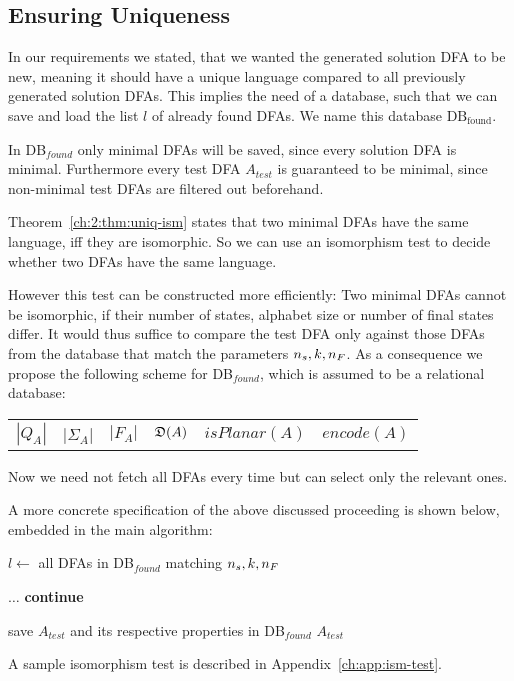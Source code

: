 \subsection{Ensuring Uniqueness}

In our requirements we stated, that we wanted the generated solution DFA to be new, meaning it should have a unique language compared to all previously generated solution DFAs. This implies the need of a database, such that we can save and load the list $l$ of already found DFAs. We name this database $\text{DB}_\text{found}$.

In DB$_{found}$ only minimal DFAs will be saved, since every solution DFA is minimal. Furthermore every test DFA $A_{test}$ is guaranteed to be minimal, since non-minimal test DFAs are filtered out beforehand.

Theorem~\ref{ch:2:thm:uniq-ism} states that two minimal DFAs have the same language, iff they are isomorphic. So we can use an isomorphism test to decide whether two DFAs have the same language.

However this test can be constructed more efficiently: Two minimal DFAs cannot be isomorphic, if their number of states, alphabet size or number of final states differ. It would thus suffice to compare the test DFA only against those DFAs from the database that match the parameters ${n_s}, k, {n_F}$. As a consequence we propose the following scheme for DB$_{found}$, which is assumed to be a relational database:
\begin{center}
	\begin{tabular}{c c c c c c}
	$|Q_A|$ & |$\Sigma_A$| & $|F_A|$ & $\mathfrak{D}(A)$ & $isPlanar(A)$ & $encode(A)$
	\end{tabular}
\end{center}
Now we need not fetch all DFAs every time but can select only the relevant ones.

A more concrete specification of the above discussed proceeding is shown below, embedded in the main algorithm:
\vspace{0.2cm}
\begin{algorithmic}[1]
	
		\vspace{0.2cm}
	
		\State $l \gets$ all DFAs in DB$_{found}$ matching ${n_s}, k, {n_F}$
		
		\vspace{0.2cm}
		
		
		\vspace{0.2cm}
		
			\State $\ldots$
				\State \textbf{continue}
			\EndIf
			
			\vspace{0.2cm}
			
			\State save $A_{test}$ and its respective properties in DB$_{found}$
			\State\Return $A_{test}$
		\EndWhile
	\EndFunction
\end{algorithmic}
\vspace{0.2cm}
A sample isomorphism test is described in Appendix~\ref{ch:app:ism-test}.

